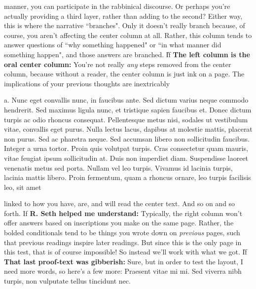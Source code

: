 \documentclass[11pt,letterpaper,openany]{scrbook}
\newcommand{\rightcitation}[1]{\rightcitationfont{\normalsize\textcolor{hcolor}{#1}}}
\begin{document}
\begin{sloppypar}
\begin{paracol}{3}
\switchcolumn

\fontsize{11}{13}\rightfont manner, you can participate in the rabbinical discourse. Or perhaps you're actually providing a third layer, rather than adding to the second? Either way, this is where the narrative ``branches". Only it doesn't really branch because, of course,  you aren't affecting the center column at all. Rather, this column tends to answer questions of ``why something happened" or ``in what manner did something happen", and those answers are branched. \big\| If \textbf{The left column is the oral center column:} You're not really \textit{any} steps  removed from the center column, because without a reader, the center column is just ink on a page. The implications of your previous thoughts are inextricably

\end{paracol}

\begin{paracol}{2}\fontsize{11}{13}\leftfont a. Nunc eget convallis nunc, in faucibus ante. Sed dictum varius neque commodo hendrerit. Sed maximus ligula nunc, et tristique sapien faucibus et. Donec dictum turpis ac odio rhoncus consequat. Pellentesque metus nisi, sodales ut vestibulum vitae, convallis eget purus. Nulla lectus lacus, dapibus at molestie mattis, placerat non purus. Sed ac pharetra neque. Sed accumsan libero non sollicitudin faucibus. Integer a urna tortor. Proin quis volutpat turpis. Cras consectetur quam mauris, vitae feugiat ipsum sollicitudin at. Duis non imperdiet diam. Suspendisse laoreet venenatis metus sed porta. Nullam vel leo turpis. Vivamus id lacinia turpis, lacinia mattis libero. Proin fermentum, quam a rhoncus ornare, leo turpis facilisis leo, sit amet

\switchcolumn

\fontsize{11}{13}\rightfont linked to how you have, are, and will read the center text. And so on and so forth. \rightcitation{ב} \rightfont If \textbf{R. Seth helped me understand:} Typically, the right column won't offer answers based on inscriptions you make on the same page. Rather, the bolded conditionals tend to be things you wrote down on \textit{previous} pages, such that previous readings inspire later readings. But since this is the only page in this test, that is of course impossible! So instead we'll work with what we got. \big\| If \textbf{That last proof-text was gibberish:} Sure, but in order to test the layout, I need more words, so here's a few more: Praesent vitae mi mi. Sed viverra nibh turpis, non vulputate tellus tincidunt nec.


\end{paracol}
\end{sloppypar}
\end{document}
